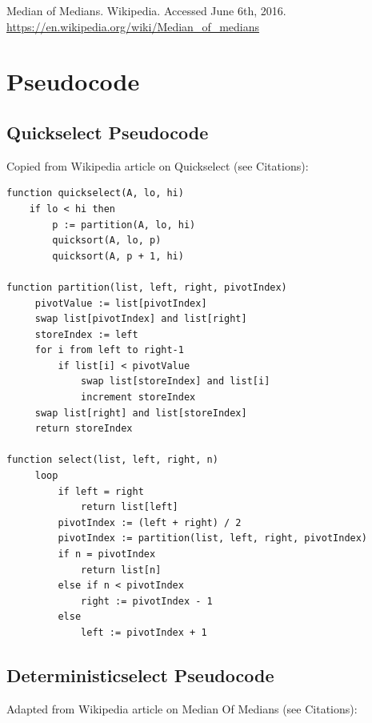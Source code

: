 \documentclass{article}
\begin{document}
\noindent Median of Medians. Wikipedia. Accessed June 6th, 2016. \url{https://en.wikipedia.org/wiki/Median_of_medians}

\pagebreak

\section*{Pseudocode}

\subsection*{Quickselect Pseudocode}
Copied from Wikipedia article on Quickselect (see Citations):
\begin{lstlisting}
function quickselect(A, lo, hi)
    if lo < hi then
        p := partition(A, lo, hi)
        quicksort(A, lo, p)
        quicksort(A, p + 1, hi)
        
function partition(list, left, right, pivotIndex)
     pivotValue := list[pivotIndex]
     swap list[pivotIndex] and list[right]
     storeIndex := left
     for i from left to right-1
         if list[i] < pivotValue
             swap list[storeIndex] and list[i]
             increment storeIndex
     swap list[right] and list[storeIndex]
     return storeIndex
     
function select(list, left, right, n)
     loop
         if left = right
             return list[left]
         pivotIndex := (left + right) / 2
         pivotIndex := partition(list, left, right, pivotIndex)
         if n = pivotIndex
             return list[n]
         else if n < pivotIndex
             right := pivotIndex - 1
         else
             left := pivotIndex + 1
\end{lstlisting}

\subsection*{Deterministicselect Pseudocode}
Adapted from Wikipedia article on Median Of Medians (see Citations):
\end{document}
